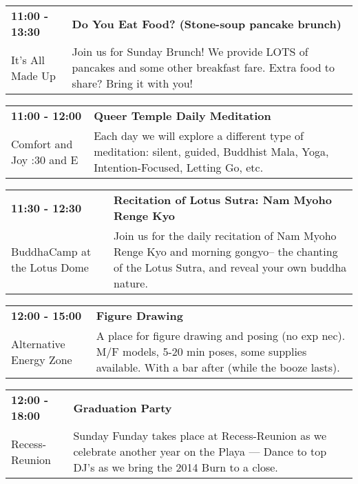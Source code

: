 \begin{tabular}{ p{1in} p{2.2in} }
    \textbf{11:00 - 13:30} & \textbf{Do You Eat Food? (Stone-soup pancake brunch)} \\
    It's All Made Up \newline  & Join us for Sunday Brunch! We provide LOTS of pancakes and some other breakfast fare. Extra food to share? Bring it with you! \\
    \hline 
\end{tabular}
    
\begin{tabular}{ p{1in} p{2.2in} }
    \textbf{11:00 - 12:00} & \textbf{Queer Temple Daily Meditation} \\
    Comfort and Joy \newline 7:30 and E & Each day we will explore a different type of meditation: silent, guided, Buddhist Mala, Yoga, Intention-Focused, Letting Go, etc. \\
    \hline 
\end{tabular}
    
\begin{tabular}{ p{1in} p{2.2in} }
    \textbf{11:30 - 12:30} & \textbf{Recitation of Lotus Sutra: Nam Myoho Renge Kyo} \\
    BuddhaCamp at the Lotus Dome \newline  & Join us for the daily recitation of Nam Myoho Renge Kyo and morning gongyo-- the chanting of the Lotus Sutra, and reveal your own buddha nature. \\
    \hline 
\end{tabular}
    
\begin{tabular}{ p{1in} p{2.2in} }
    \textbf{12:00 - 15:00} & \textbf{Figure Drawing} \\
    Alternative Energy Zone \newline  & A place for figure drawing and posing (no exp nec).  M/F models, 5-20 min poses, some supplies available. With a bar after (while the booze lasts). \\
    \hline 
\end{tabular}
    
\begin{tabular}{ p{1in} p{2.2in} }
    \textbf{12:00 - 18:00} & \textbf{Graduation Party} \\
    Recess-Reunion \newline  & Sunday Funday takes place at Recess-Reunion as we celebrate another year on the Playa --- Dance to top DJ's as we bring the 2014 Burn to a close. \\
    \hline 
\end{tabular}
    
